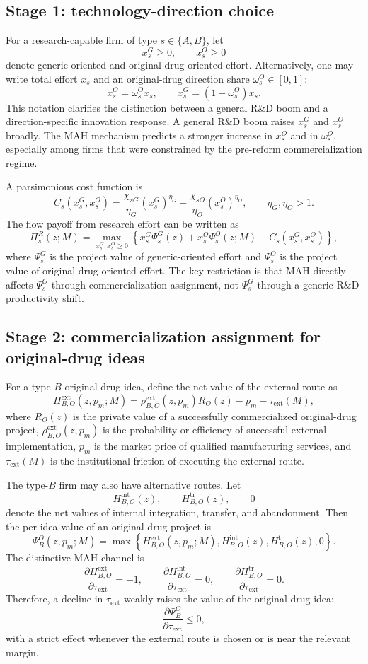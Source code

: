 \documentclass[12pt]{article}
\newcommand{\tauext}{\tau_{\mathrm{ext}}}
\begin{document}
\subsection{Stage 1: technology-direction choice}

For a research-capable firm of type $s\in\{A,B\}$, let
\[
x_s^G\geq 0, \qquad x_s^O\geq 0
\]
denote generic-oriented and original-drug-oriented effort. Alternatively, one may write total effort $x_s$ and an original-drug direction share $\omega_s^O\in[0,1]$:
\[
x_s^O=\omega_s^O x_s,\qquad x_s^G=(1-\omega_s^O)x_s.
\]
This notation clarifies the distinction between a general R\&D boom and a direction-specific innovation response. A general R\&D boom raises $x_s^G$ and $x_s^O$ broadly. The MAH mechanism predicts a stronger increase in $x_s^O$ and in $\omega_s^O$, especially among firms that were constrained by the pre-reform commercialization regime.

A parsimonious cost function is
\[
C_s(x_s^G,x_s^O)=\frac{\chi_{sG}}{\eta_G}(x_s^G)^{\eta_G}+\frac{\chi_{sO}}{\eta_O}(x_s^O)^{\eta_O},
\qquad \eta_G,\eta_O>1.
\]
The flow payoff from research effort can be written as
\[
\Pi_s^{R}(z;M)=\max_{x_s^G,x_s^O\geq0}
\left\{x_s^G \Psi_s^G(z)+x_s^O\Psi_s^O(z;M)-C_s(x_s^G,x_s^O)\right\},
\]
where $\Psi_s^G$ is the project value of generic-oriented effort and $\Psi_s^O$ is the project value of original-drug-oriented effort. The key restriction is that MAH directly affects $\Psi_s^O$ through commercialization assignment, not $\Psi_s^G$ through a generic R\&D productivity shift.

\subsection{Stage 2: commercialization assignment for original-drug ideas}

For a type-$B$ original-drug idea, define the net value of the external route as
\[
H_{B,O}^{\mathrm{ext}}(z,p_m;M)
=\rho_{B,O}^{\mathrm{ext}}(z,p_m)R_O(z)-p_m-\tauext(M),
\]
where $R_O(z)$ is the private value of a successfully commercialized original-drug project, $\rho_{B,O}^{\mathrm{ext}}(z,p_m)$ is the probability or efficiency of successful external implementation, $p_m$ is the market price of qualified manufacturing services, and $\tauext(M)$ is the institutional friction of executing the external route.

The type-$B$ firm may also have alternative routes. Let
\[
H_{B,O}^{\mathrm{int}}(z), \qquad H_{B,O}^{\mathrm{tr}}(z), \qquad 0
\]
denote the net values of internal integration, transfer, and abandonment. Then the per-idea value of an original-drug project is
\[
\Psi_B^O(z,p_m;M)=\max\left\{
H_{B,O}^{\mathrm{ext}}(z,p_m;M),
H_{B,O}^{\mathrm{int}}(z),
H_{B,O}^{\mathrm{tr}}(z),
0
\right\}.
\]
The distinctive MAH channel is
\[
\frac{\partial H_{B,O}^{\mathrm{ext}}}{\partial \tauext}=-1,
\qquad
\frac{\partial H_{B,O}^{\mathrm{int}}}{\partial \tauext}=0,
\qquad
\frac{\partial H_{B,O}^{\mathrm{tr}}}{\partial \tauext}=0.
\]
Therefore, a decline in $\tauext$ weakly raises the value of the original-drug idea:
\[
\frac{\partial \Psi_B^O}{\partial \tauext}\leq 0,
\]
with a strict effect whenever the external route is chosen or is near the relevant margin.
\end{document}
